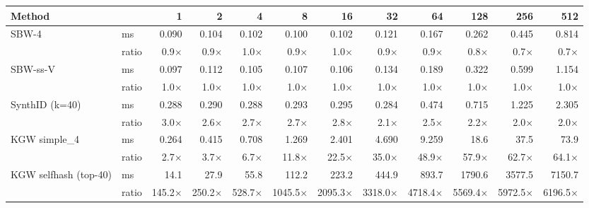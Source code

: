 \begin{tabular}{@{}ll|rrrrrrrrrr@{}}
\toprule
Method & & 1 & 2 & 4 & 8 & 16 & 32 & 64 & 128 & 256 & 512 \\
\midrule
\multirow{2}{*}{SBW-4} & ms & 0.090 & 0.104 & 0.102 & 0.100 & 0.102 & 0.121 & 0.167 & 0.262 & 0.445 & 0.814 \\
 & ratio & 0.9$\times$ & 0.9$\times$ & 1.0$\times$ & 0.9$\times$ & 1.0$\times$ & 0.9$\times$ & 0.9$\times$ & 0.8$\times$ & 0.7$\times$ & 0.7$\times$ \\
\midrule
\multirow{2}{*}{SBW-ss-V} & ms & 0.097 & 0.112 & 0.105 & 0.107 & 0.106 & 0.134 & 0.189 & 0.322 & 0.599 & 1.154 \\
 & ratio & 1.0$\times$ & 1.0$\times$ & 1.0$\times$ & 1.0$\times$ & 1.0$\times$ & 1.0$\times$ & 1.0$\times$ & 1.0$\times$ & 1.0$\times$ & 1.0$\times$ \\
\midrule
\multirow{2}{*}{SynthID (k=40)} & ms & 0.288 & 0.290 & 0.288 & 0.293 & 0.295 & 0.284 & 0.474 & 0.715 & 1.225 & 2.305 \\
 & ratio & 3.0$\times$ & 2.6$\times$ & 2.7$\times$ & 2.7$\times$ & 2.8$\times$ & 2.1$\times$ & 2.5$\times$ & 2.2$\times$ & 2.0$\times$ & 2.0$\times$ \\
\midrule
\multirow{2}{*}{KGW simple\_4} & ms & 0.264 & 0.415 & 0.708 & 1.269 & 2.401 & 4.690 & 9.259 & 18.6 & 37.5 & 73.9 \\
 & ratio & 2.7$\times$ & 3.7$\times$ & 6.7$\times$ & 11.8$\times$ & 22.5$\times$ & 35.0$\times$ & 48.9$\times$ & 57.9$\times$ & 62.7$\times$ & 64.1$\times$ \\
\midrule
\multirow{2}{*}{KGW selfhash (top-40)} & ms & 14.1 & 27.9 & 55.8 & 112.2 & 223.2 & 444.9 & 893.7 & 1790.6 & 3577.5 & 7150.7 \\
 & ratio & 145.2$\times$ & 250.2$\times$ & 528.7$\times$ & 1045.5$\times$ & 2095.3$\times$ & 3318.0$\times$ & 4718.4$\times$ & 5569.4$\times$ & 5972.5$\times$ & 6196.5$\times$ \\
\bottomrule
\end{tabular}
